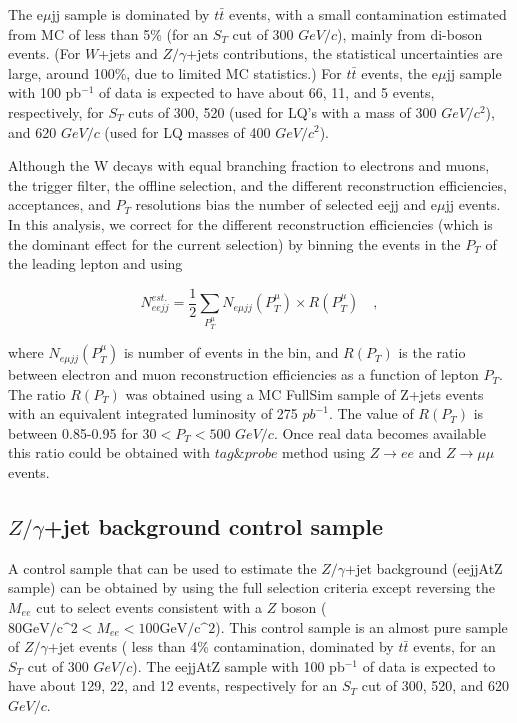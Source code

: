 \documentclass{cmspaper}
\begin{document}
\begin{linenumbers}
The e$\mu$jj sample is dominated by $t\bar{t}$ events, 
with a small contamination estimated from MC of less than 5\% (for an 
$S_{T}$ cut of 300 $GeV/c$), 
mainly from di-boson events. (For $W$+jets and $Z/\gamma$+jets 
contributions, the statistical 
uncertainties are large, around 100\%, due to limited MC statistics.) 
For $t\bar{t}$ events, the e$\mu$jj sample with 100 pb$^{-1}$ of data 
is expected to have about 66, 11, and 5 events, respectively, 
for $S_{T}$ cuts of 300, 520 (used for LQ's with a mass of
300 $GeV/c^2$), and 620 $GeV/c$ (used for LQ masses of 400 $GeV/c^2$).

Although the W decays with equal branching fraction to electrons and muons,
the trigger filter, the offline selection, and the 
different reconstruction efficiencies,
acceptances, and $P_{T}$ resolutions  bias the number of selected eejj 
and e$\mu$jj events. 
In this analysis, we correct for the different reconstruction efficiencies
(which is the dominant effect for the current selection) by
binning the events in the $P_T$ of the leading lepton and using

\begin{equation} \label{formula:NeejFromNemujj}
N_{eejj}^{est.} = \frac{1}{2}\sum_{P_{T}^{\mu}} N_{e\mu jj}(P_{T}^{\mu}) \times R(P_{T}^{\mu}) \quad , 
\end{equation}

where $N_{e\mu jj}(P_{T}^{\mu})$ is number of events in the bin, 
and $R(P_{T})$ is the ratio between electron 
and muon reconstruction efficiencies as a function of lepton $P_{T}$. 
The ratio $R(P_{T})$ was obtained 
using a MC FullSim sample of Z+jets 
events with an equivalent integrated luminosity of 275 $pb^{-1}$.
The value of $R(P_{T})$ is between 0.85-0.95 for $30 < P_{T} < 500$ $GeV/c$.
Once real data becomes available this ratio could be obtained with $tag\&probe$ method using $Z \rightarrow ee$ and 
$Z \rightarrow \mu\mu$ events.

\subsection{$Z/\gamma$+jet background control sample} \label{sec:ZcontrolSample}

A control sample that can be used to
estimate the $Z/\gamma$+jet background (eejjAtZ sample) 
can be obtained by using the full selection criteria except reversing 
the $M_{ee}$ cut to select events consistent with a $Z$ boson
($80\mbox{GeV/c^2} < M_{ee} < 100\mbox{GeV/c^2}$). 
This control sample is an almost pure sample of  
$Z/\gamma$+jet events 
( less than 4\% contamination, dominated by $t\bar{t}$ events, 
for an $S_{T}$ cut of 300 $GeV/c$). 
The eejjAtZ sample with 100 pb$^{-1}$ of data 
is expected to have about 129, 22, and 12 events, respectively for an $S_{T}$ cut of 300, 520, and 620 $GeV/c$.


\end{linenumbers}
\end{document}
